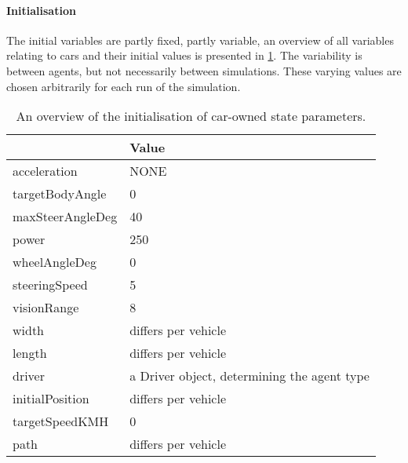 \paragraph{Initialisation}
\label{par:method:model:details:initialization}
The initial variables are partly fixed, partly variable, an overview of all variables relating to cars and their initial values is presented in \cref{tab:par:method:model:details:init:car:value}. The variability is between agents, but not necessarily between simulations. These varying values are chosen arbitrarily for each run of the simulation.

\begin{table}
	\centering
	\begin{tabular}{ >{\ttfamily}l  p{10.5cm} }
		\toprule
		\normalfont{Parameter}	& Value \\  
		\midrule
		acceleration 			& NONE \\ 
		targetBodyAngle 		& 0 \\ 
		maxSteerAngleDeg 		& 40 \\ 
		power 					& 250 \\ 
		wheelAngleDeg 			& 0 \\ 
		steeringSpeed 			& 5 \\ 
		visionRange 			& 8 \\ 
		width 					& differs per vehicle \\ 
		length 					& differs per vehicle \\ 
		driver 					& a Driver object, determining the agent type \\ 
		initialPosition 		& differs per vehicle \\ 
		targetSpeedKMH			& 0 \\ 
		path					& differs per vehicle \\ 
		\bottomrule
	\end{tabular}
	\caption{An overview of the initialisation of car-owned state parameters.}
	\label{tab:par:method:model:details:init:car:value}
\end{table} 

